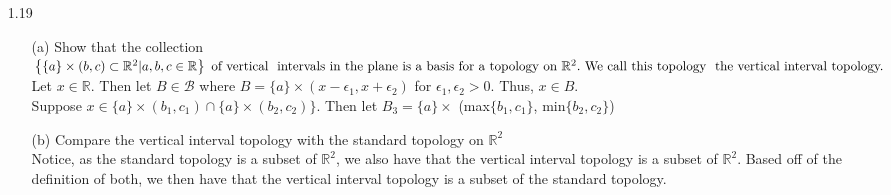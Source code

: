 \documentclass[12pt]{article}
\newcommand{\R}{\mathds{R}}
\begin{document}
\begin{enumerate}
	\item[1.19] 
	\begin{enumerate}
		\item[(a)]  Show that the collection $ \left\{ \{ a \} \times ( b , c ) \subset \mathbb { R } ^ { 2 } | a , b , c \in \mathbb { R } \right\} \text { of vertical } \text { intervals in the plane is a} \\ \text{ basis for a topology on } \mathbb { R } ^ { 2 } . \text { We call this topology } \text { the vertical interval topology. } $\\
		Let $ x\in \R $. Then let $ B\in \mathcal {B} $ where $ B = \{a\} \times (x-\epsilon_1,x+\epsilon_2) $ for $ \epsilon_1, \epsilon_2 > 0 $. Thus, $ x \in B. $\\
		Suppose $ x  \in \{a\}\times(b_1,c_1)\cap\{a\}\times(b_2,c_2)\} $. Then let $ B_3 = \{a\} \times $ (max$ \{b_1,c_1\} $, min$ \{b_2,c_2\} $)
		\item[(b)] Compare the vertical interval topology with the standard topology on $ \mathbb {R}^2 $\\
		Notice, as the standard topology is a subset of $ \R^2 $, we also have that the vertical interval topology is a subset of $ \R^2 $. Based off of the definition of both, we then have that the vertical interval topology is a subset of the standard topology.
	\end{enumerate}
\end{enumerate}
 
\end{document}
